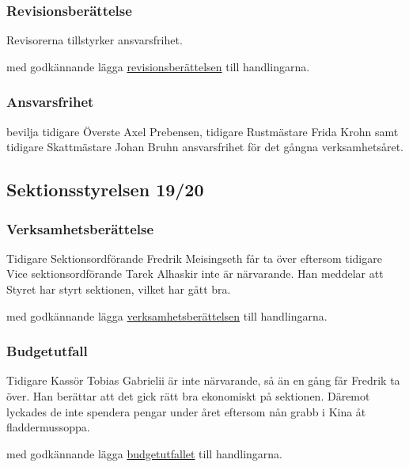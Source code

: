 \documentclass[hidelinks]{sektionsmote}
\begin{document}
\subsubsection{Revisionsberättelse}
Revisorerna tillstyrker ansvarsfrihet.
\begin{beslut}
    \item med godkännande lägga \hyperlink{bilagor/dp/rb.pdf.1}{revisionsberättelsen} till handlingarna.
\end{beslut}

\subsubsection{Ansvarsfrihet}
\begin{beslut}
    \item bevilja tidigare Överste Axel Prebensen, tidigare Rustmästare Frida Krohn samt tidigare Skattmästare Johan Bruhn ansvarsfrihet för det gångna verksamhetsåret.
\end{beslut}

\subsection{Sektionsstyrelsen 19/20}

\subsubsection{Verksamhetsberättelse}
Tidigare Sektionsordförande Fredrik Meisingseth får ta över eftersom tidigare Vice sektionsordförande Tarek Alhaskir inte är närvarande.
Han meddelar att Styret har styrt sektionen, vilket har gått bra.
\begin{beslut}
    \item med godkännande lägga \hyperlink{bilagor/styret/vb.pdf.1}{verksamhetsberättelsen} till handlingarna.
\end{beslut}

\subsubsection{Budgetutfall}
Tidigare Kassör Tobias Gabrielii är inte närvarande, så än en gång får Fredrik ta över.
Han berättar att det gick rätt bra ekonomiskt på sektionen.
Däremot lyckades de inte spendera pengar under året eftersom nån grabb i Kina åt fladdermussoppa.
\begin{beslut}
    \item med godkännande lägga \hyperlink{bilagor/styret/budgetutfall.pdf.1}{budgetutfallet} till handlingarna.
\end{beslut}
\end{document}

